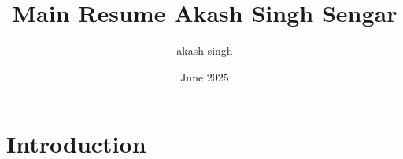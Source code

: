 \documentclass{article}
\title{Main Resume Akash Singh Sengar}
\author{akash singh}
\date{June 2025}
\begin{document}
\maketitle

\section{Introduction}
\end{document}
